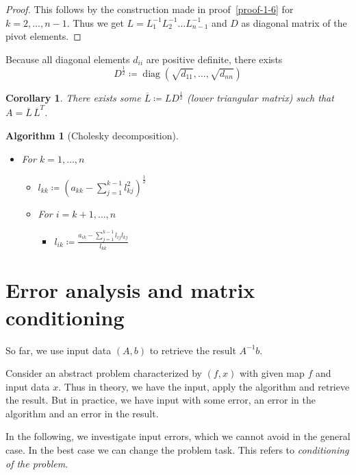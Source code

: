\documentclass[a4paper]{article}
\newcounter{lecref}[section]
\numberwithin{lecref}{section}
\theoremstyle{break}
\newtheorem{algorithm}{Algorithm}
\newtheorem{corollary}[lecref]{Corollary}
\DeclareMathOperator{\diag}{diag}
\begin{document}
\begin{proof}
  This follows by the construction made in proof~\ref{proof-1-6} for $k=2,\dots,n-1$.
  Thus we get $L = L_1^{-1} L_2^{-1} \dots L_{n-1}^{-1}$ and $D$ as diagonal matrix of the pivot elements.
\end{proof}

Because all diagonal elements $d_{ii}$ are positive definite, there exists
\[ D^{\frac12} \coloneqq \diag\left(\sqrt{d_{11}}, \dots, \sqrt{d_{nn}}\right) \]

\begin{corollary}
  \label{corollary-1-8}
  There exists some $\overline{L} \coloneqq LD^{\frac12}$ (lower triangular matrix) such that $A = \overline{L} \, \overline{L}^T$.
\end{corollary}

\begin{algorithm}[Cholesky decomposition]\hfill{}
  \begin{itemize}
    \item For $k = 1, \dots, n$
      \begin{itemize}
        \item $l_{kk} \coloneqq (a_{kk} - \sum_{j=1}^{k-1} l_{kj}^2)^{\frac12}$
        \item For $i = k+1, \dots, n$
          \begin{itemize}
            \item $l_{ik} \coloneqq \frac{a_{ik} - \sum_{j=1}^{k-1} l_{ij} l_{kj}}{l_{kk}}$
          \end{itemize}
      \end{itemize}
  \end{itemize}
\end{algorithm}

\section{Error analysis and matrix conditioning}

So far, we use input data $(A, b)$ to retrieve the result $A^{-1} b$.

Consider an abstract problem characterized by $(f, x)$ with given map $f$ and input data $x$.
Thus in theory, we have the input, apply the algorithm and retrieve the result.
But in practice, we have input with some error, an error in the algorithm and an error in the result.

In the following, we investigate input errors, which we cannot avoid in the general case.
In the best case we can change the problem task. This refers to \emph{conditioning of the problem}.
\end{document}

